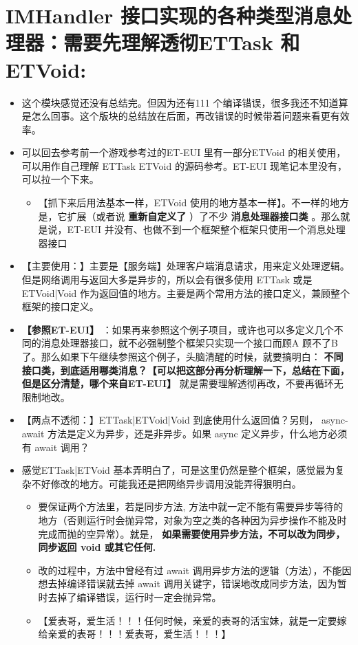 \documentclass[9pt, b5paper]{article}
\begin{document}
\section{IMHandler 接口实现的各种类型消息处理器：需要先理解透彻ETTask 和 ETVoid:}
\label{sec-12}
\begin{itemize}
\item 这个模块感觉还没有总结完。但因为还有111 个编译错误，很多我还不知道算是怎么回事。这个版块的总结放在后面，再改错误的时候带着问题来看更有效率。
\item 可以回去参考前一个游戏参考过的ET-EUI 里有一部分ETVoid 的相关使用，可以用作自己理解 ETTask ETVoid 的源码参考。ET-EUI 现笔记本里没有，可以拉一个下来。
\begin{itemize}
\item 【抓下来后用法基本一样，ETVoid 使用的地方基本一样】。不一样的地方是，它扩展（或者说 \textbf{重新自定义了} ）了不少 \textbf{消息处理器接口类} 。那么就是说，ET-EUI 并没有、也做不到一个框架整个框架只使用一个消息处理器接口
\end{itemize}
\item 【主要使用：】主要是【服务端】处理客户端消息请求，用来定义处理逻辑。但是网络调用与返回大多是异步的，所以会有很多使用 ETTask 或是 ETVoid|Void 作为返回值的地方。主要是两个常用方法的接口定义，兼顾整个框架的接口定义。
\item \textbf{【参照ET-EUI】} ：如果再来参照这个例子项目，或许也可以多定义几个不同的消息处理器接口，就不必强制整个框架只实现一个接口而顾A 顾不了B 了。那么如果下午继续参照这个例子，头脑清醒的时候，就要搞明白： \textbf{不同接口类，到底适用哪类消息？【可以把这部分再分析理解一下，总结在下面，但是区分清楚，哪个来自ET-EUI】} 就是需要理解透彻再改，不要再循环无限制地改。
\item 【两点不透彻：】ETTask|ETVoid|Void 到底使用什么返回值？另则， async-await 方法是定义为异步，还是非异步。如果 async 定义异步，什么地方必须有 await 调用？
\item 感觉ETTask|ETVoid 基本弄明白了，可是这里仍然是整个框架，感觉最为复杂不好修改的地方。可能我还是把网络异步调用没能弄得狠明白。
\begin{itemize}
\item 要保证两个方法里，若是同步方法, 方法中就一定不能有需要异步等待的地方（否则运行时会抛异常，对象为空之类的各种因为异步操作不能及时完成而抛的空异常）。就是， \textbf{如果需要使用异步方法，不可以改为同步，同步返回 void 或其它任何.}
\item 改的过程中，方法中曾经有过 await 调用异步方法的逻辑（方法），不能因想去掉编译错误就去掉 await 调用关键字，错误地改成同步方法，因为暂时去掉了编译错误，运行时一定会抛异常。
\item 【爱表哥，爱生活！！！任何时候，亲爱的表哥的活宝妹，就是一定要嫁给亲爱的表哥！！！爱表哥，爱生活！！！】
\end{itemize}
\end{itemize}
\end{document}
